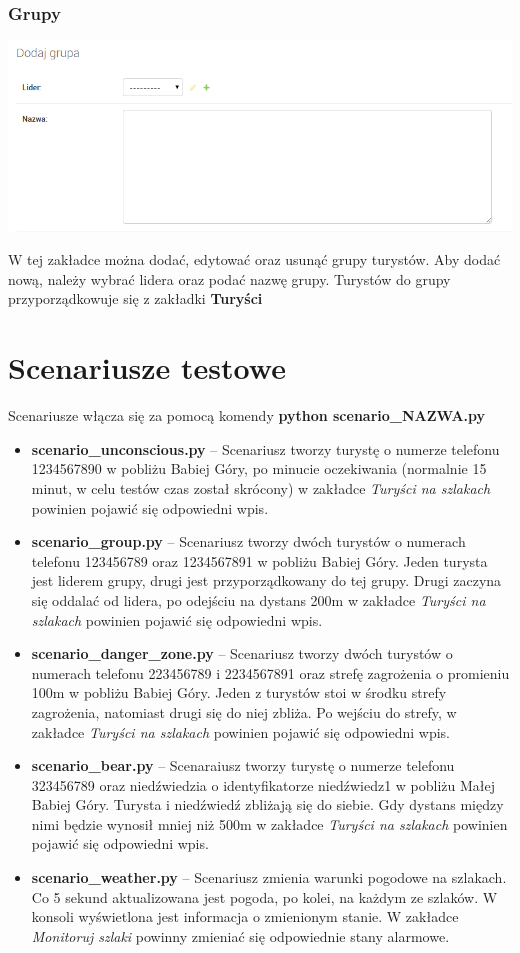 \documentclass[a4paper,12pt]{article}
\begin{document}
\subsubsection{Grupy}
\begin{center}
\includegraphics[scale=1]{ui7.png}
\end{center}
W tej zakładce można dodać, edytować oraz usunąć grupy turystów. Aby dodać nową, należy wybrać lidera oraz podać nazwę grupy. Turystów do grupy przyporządkowuje się z zakładki \textbf{Turyści}
\newpage
\section{Scenariusze testowe}
Scenariusze włącza się za pomocą komendy \textbf{python scenario\_NAZWA.py}
\begin{itemize}
\item \textbf{scenario\_unconscious.py} -- Scenariusz tworzy turystę o numerze telefonu 1234567890 w pobliżu Babiej Góry, po minucie oczekiwania (normalnie 15 minut, w celu testów czas został skrócony) w zakładce \textit{Turyści na szlakach} powinien pojawić się odpowiedni wpis.
\item \textbf{scenario\_group.py} -- Scenariusz tworzy dwóch turystów o numerach telefonu 123456789 oraz 1234567891 w pobliżu Babiej Góry. Jeden turysta jest liderem grupy, drugi jest przyporządkowany do tej grupy. Drugi zaczyna się oddalać od lidera, po odejściu na dystans 200m w zakładce \textit{Turyści na szlakach} powinien pojawić się odpowiedni wpis.
\item \textbf{scenario\_danger\_zone.py} -- Scenariusz tworzy dwóch turystów o numerach telefonu 223456789 i 2234567891 oraz strefę zagrożenia o promieniu 100m w pobliżu Babiej Góry. Jeden z turystów stoi w środku strefy zagrożenia, natomiast drugi się do niej zbliża. Po wejściu do strefy, w zakładce \textit{Turyści na szlakach} powinien pojawić się odpowiedni wpis.
\item \textbf{scenario\_bear.py} -- Scenaraiusz tworzy turystę o numerze telefonu 323456789 oraz niedźwiedzia o identyfikatorze niedźwiedz1 w pobliżu Małej Babiej Góry. Turysta i niedźwiedź zbliżają się do siebie. Gdy dystans między nimi będzie wynosił mniej niż 500m w zakładce \textit{Turyści na szlakach} powinien pojawić się odpowiedni wpis.
\item \textbf{scenario\_weather.py} -- Scenariusz zmienia warunki pogodowe na szlakach. Co 5 sekund aktualizowana jest pogoda, po kolei, na każdym ze szlaków. W konsoli wyświetlona jest informacja o zmienionym stanie. W zakładce \textit{Monitoruj szlaki} powinny zmieniać się odpowiednie stany alarmowe.
\end{itemize}
\newpage
\end{document}
